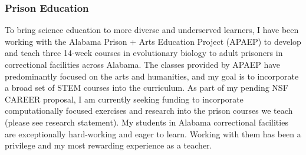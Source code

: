 \subsubsection*{Prison Education}
To bring science education to more diverse and underserved learners,
I have been working with
the Alabama Prison + Arts Education Project (APAEP) to develop and teach three
14-week courses in evolutionary biology to adult prisoners in correctional
facilities across Alabama.
The classes provided by APAEP have predominantly focused on the
arts and humanities, and
my
goal is to incorporate a broad set of STEM courses into the
curriculum.
As part of my pending NSF CAREER proposal, I am currently
seeking funding to incorporate computationally focused
exercises and research into the prison courses we teach
(please see research statement).
My students in Alabama correctional facilities are exceptionally hard-working
and eager to learn.
Working with them has been a privilege and my most rewarding experience as a
teacher.


